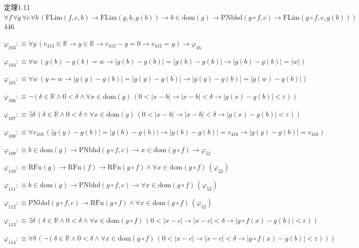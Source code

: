 \begin{fullproof}{定理1.11}{$\forall f\,\forall g\,\forall c\,\forall b\,(\mathrm{FLim}(f,c,b) \to \mathrm{FLim}(g,b,g(b)) \to b \in \mathrm{dom}(g) \to \mathrm{PNbhd}(g \circ f,c) \to \mathrm{FLim}(g \circ f,c,g(b)))$}{446}
\begin{abbrevlist}
\item $\varphi_{103} :\equiv \forall y\,(v_{412} \in \mathbb{R} \to y \in \mathbb{R} \to v_{412} - y = 0 \to v_{412} = y) \to \varphi_{16}$
\item $\varphi_{104} :\equiv \forall w\,(g(b) - g(b) = w \to \lvert g(b) - g(b) \rvert = \lvert g(b) - g(b) \rvert \to \lvert g(b) - g(b) \rvert = \lvert w \rvert)$
\item $\varphi_{105} :\equiv \forall w\,(y = w \to \lvert g(y) - g(b) \rvert = \lvert g(y) - g(b) \rvert \to \lvert g(y) - g(b) \rvert = \lvert g(w) - g(b) \rvert)$
\item $\varphi_{106} :\equiv \neg (\delta \in \mathbb{R} \land 0 < \delta \land \forall x \in \mathrm{dom}(g)\,(0 < \lvert x - b \rvert \to \lvert x - b \rvert < \delta \to \lvert g(x) - g(b) \rvert < \varepsilon))$
\item $\varphi_{107} :\equiv \exists \delta\,(\delta \in \mathbb{R} \land 0 < \delta \land \forall x \in \mathrm{dom}(g)\,(0 < \lvert x - b \rvert \to \lvert x - b \rvert < \delta \to \lvert g(x) - g(b) \rvert < \varepsilon))$
\item $\varphi_{108} :\equiv \forall v_{416}\,(\lvert g(y) - g(b) \rvert = \lvert g(b) - g(b) \rvert \to \lvert g(b) - g(b) \rvert = v_{416} \to \lvert g(y) - g(b) \rvert = v_{416})$
\item $\varphi_{109} :\equiv b \in \mathrm{dom}(g) \to \mathrm{PNbhd}(g \circ f,c) \to x \in \mathrm{dom}(g \circ f) \to \varphi_{52}$
\item $\varphi_{110} :\equiv \mathrm{RFn}(g) \to \mathrm{RFn}(f) \to \mathrm{RFn}(g \circ f) \land \forall x \in \mathrm{dom}(g \circ f)\,(\varphi_{52})$
\item $\varphi_{111} :\equiv b \in \mathrm{dom}(g) \to \mathrm{PNbhd}(g \circ f,c) \to \forall x \in \mathrm{dom}(g \circ f)\,(\varphi_{52})$
\item $\varphi_{112} :\equiv \mathrm{PNbhd}(g \circ f,c) \to \mathrm{RFn}(g \circ f) \land \forall x \in \mathrm{dom}(g \circ f)\,(\varphi_{52})$
\item $\varphi_{113} :\equiv \exists \delta\,(\delta \in \mathbb{R} \land 0 < \delta \land \forall x \in \mathrm{dom}(g \circ f)\,(0 < \lvert x - c \rvert \to \lvert x - c \rvert < \delta \to \lvert g \circ f(x) - g(b) \rvert < \varepsilon))$
\item $\varphi_{114} :\equiv \forall \delta\,(\neg (\delta \in \mathbb{R} \land 0 < \delta \land \forall x \in \mathrm{dom}(g \circ f)\,(0 < \lvert x - c \rvert \to \lvert x - c \rvert < \delta \to \lvert g \circ f(x) - g(b) \rvert < \varepsilon)))$

\end{abbrevlist}
\end{fullproof}
